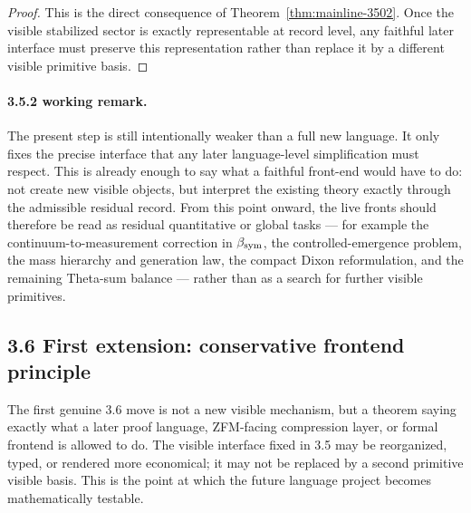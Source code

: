 \begin{proof}
This is the direct consequence of Theorem~\ref{thm:mainline-3502}. Once the visible stabilized sector is exactly representable at record level, any faithful later interface must preserve this representation rather than replace it by a different visible primitive basis.
\end{proof}

\paragraph{3.5.2 working remark.}
The present step is still intentionally weaker than a full new language. It only fixes the precise interface that any later language-level simplification must respect. This is already enough to say what a faithful front-end would have to do: not create new visible objects, but interpret the existing theory exactly through the admissible residual record. From this point onward, the live fronts should therefore be read as residual quantitative or global tasks --- for example the continuum-to-measurement correction in $\beta_{\mathrm{sym}}$, the controlled-emergence problem, the mass hierarchy and generation law, the compact Dixon reformulation, and the remaining Theta-sum balance --- rather than as a search for further visible primitives.



\subsection*{3.6 First extension: conservative frontend principle}
The first genuine 3.6 move is not a new visible mechanism, but a theorem saying exactly what a later proof language, ZFM-facing compression layer, or formal frontend is allowed to do. The visible interface fixed in 3.5 may be reorganized, typed, or rendered more economical; it may not be replaced by a second primitive visible basis. This is the point at which the future language project becomes mathematically testable.

